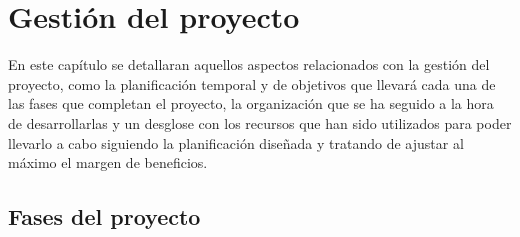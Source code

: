 \chapter{Gestión del proyecto}

En este capítulo se detallaran aquellos aspectos relacionados con la gestión del proyecto, como la planificación temporal y de objetivos que llevará cada una de las fases que completan el proyecto, la organización que se ha seguido a la hora de desarrollarlas y un desglose con los recursos que han sido utilizados para poder llevarlo a cabo siguiendo la planificación diseñada y tratando de ajustar al máximo el margen de beneficios.

\section{Fases del proyecto}

